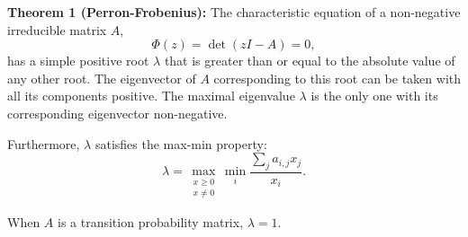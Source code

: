 \textbf{Theorem 1 (Perron-Frobenius):} The characteristic equation of a non-negative irreducible matrix $A$,
$$\Phi(z) = \det(zI - A) = 0,$$
has a simple positive root $\lambda$ that is greater than or equal to the absolute value of any other root. The eigenvector of $A$ corresponding to this root can be taken with all its components positive. The maximal eigenvalue $\lambda$ is the only one with its corresponding eigenvector non-negative.

Furthermore, $\lambda$ satisfies the max-min property:
$$\lambda = \max_{\substack{x \geq 0 \\ x \neq 0}} \min_{i} \frac{\sum_j a_{i,j} x_j}{x_i}.$$

When $A$ is a transition probability matrix, $\lambda = 1$.
